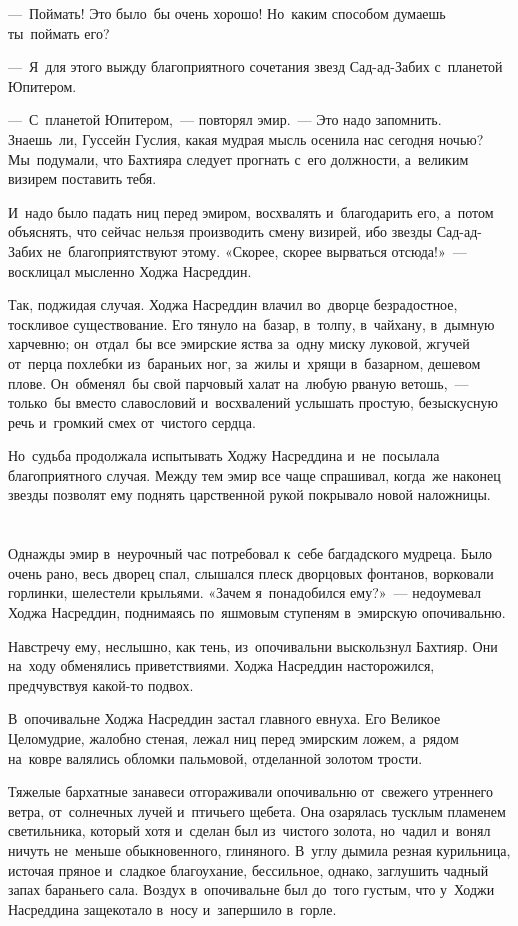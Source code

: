 \documentclass[12pt,a4paper]{book}
\begin{document}
—~Поймать! Это было~бы очень хорошо! Но~каким способом думаешь ты~поймать его?

—~Я~для этого выжду благоприятного сочетания звезд Сад-ад-Забих с~планетой Юпитером.

—~С~планетой Юпитером,~— повторял эмир.~— Это надо запомнить. Знаешь~ли, Гуссейн Гуслия, какая мудрая мысль осенила нас сегодня ночью? Мы~подумали, что Бахтияра следует прогнать с~его должности, а~великим визирем поставить тебя.

И~надо было падать ниц перед эмиром, восхвалять и~благодарить его, а~потом объяснять, что сейчас нельзя производить смену визирей, ибо звезды Сад-ад-Забих не~благоприятствуют этому. «Скорее, скорее вырваться отсюда!»~— восклицал мысленно Ходжа Насреддин.

Так, поджидая случая. Ходжа Насреддин влачил во~дворце безрадостное, тоскливое существование. Его тянуло на~базар, в~толпу, в~чайхану, в~дымную харчевню; он~отдал~бы все эмирские яства за~одну миску луковой, жгучей от~перца похлебки из~бараньих ног, за~жилы и~хрящи в~базарном, дешевом плове. Он~обменял~бы свой парчовый халат на~любую рваную ветошь,~— только~бы вместо славословий и~восхвалений услышать простую, безыскусную речь и~громкий смех от~чистого сердца.

Но~судьба продолжала испытывать Ходжу Насреддина и~не~посылала благоприятного случая. Между тем эмир все чаще спрашивал, когда~же наконец звезды позволят ему поднять царственной рукой покрывало новой наложницы.


\chapter{}

Однажды эмир в~неурочный час потребовал к~себе багдадского мудреца. Было очень рано, весь дворец спал, слышался плеск дворцовых фонтанов, ворковали горлинки, шелестели крыльями. «Зачем я~понадобился ему?»~— недоумевал Ходжа Насреддин, поднимаясь по~яшмовым ступеням в~эмирскую опочивальню.

Навстречу ему, неслышно, как тень, из~опочивальни выскользнул Бахтияр. Они на~ходу обменялись приветствиями. Ходжа Насреддин насторожился, предчувствуя какой-то подвох.

В~опочивальне Ходжа Насреддин застал главного евнуха. Его Великое Целомудрие, жалобно стеная, лежал ниц перед эмирским ложем, а~рядом на~ковре валялись обломки пальмовой, отделанной золотом трости.

Тяжелые бархатные занавеси отгораживали опочивальню от~свежего утреннего ветра, от~солнечных лучей и~птичьего щебета. Она озарялась тусклым пламенем светильника, который хотя и~сделан был из~чистого золота, но~чадил и~вонял ничуть не~меньше обыкновенного, глиняного. В~углу дымила резная курильница, источая пряное и~сладкое благоухание, бессильное, однако, заглушить чадный запах бараньего сала. Воздух в~опочивальне был до~того густым, что у~Ходжи Насреддина защекотало в~носу и~запершило в~горле.
\end{document}
